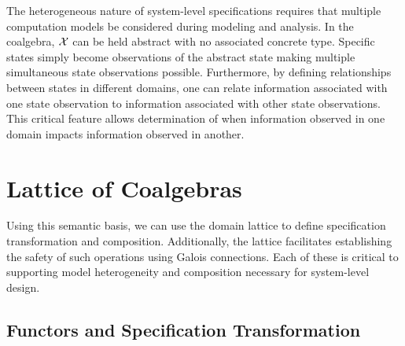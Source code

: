 \documentclass[12pt]{article}
\begin{document}

The heterogeneous nature of system-level specifications requires that multiple computation
models be considered during modeling and analysis.  In the coalgebra, $\mathcal X$ can be
held abstract with no associated concrete type.  Specific states simply become
observations of the abstract state making multiple simultaneous state observations
possible.  Furthermore, by defining relationships between states in different domains, one
can relate information associated with one state observation to information associated
with other state observations.  This critical feature allows determination of when
information observed in one domain impacts information observed in another.

\section{Lattice of Coalgebras}

Using this semantic basis, we can use the domain lattice to define specification
transformation and composition.  Additionally, the lattice facilitates establishing the
safety of such operations using Galois connections.  Each of these is critical to
supporting model heterogeneity and composition necessary for system-level design.


\subsection{Functors and Specification Transformation}
\end{document}
